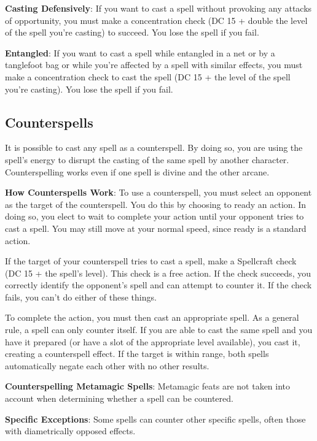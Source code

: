 \textbf{Casting Defensively}: If you want to cast a spell without provoking any attacks of opportunity, you must make a concentration check (DC 15 + double the level of the spell you're casting) to succeed. You lose the spell if you fail.
				
\textbf{Entangled}: If you want to cast a spell while entangled in a net or by a tanglefoot bag or while you're affected by a spell with similar effects, you must make a concentration check to cast the spell (DC 15 + the level of the spell you're casting). You lose the spell if you fail.
				
\subsection{Counterspells}

				
It is possible to cast any spell as a counterspell. By doing so, you are using the spell's energy to disrupt the casting of the same spell by another character. Counterspelling works even if one spell is divine and the other arcane.
				
\textbf{How Counterspells Work}: To use a counterspell, you must select an opponent as the target of the counterspell. You do this by choosing to ready an action. In doing so, you elect to wait to complete your action until your opponent tries to cast a spell. You may still move at your normal speed, since ready is a standard action.
				
If the target of your counterspell tries to cast a spell, make a Spellcraft check (DC 15 + the spell's level). This check is a free action. If the check succeeds, you correctly identify the opponent's spell and can attempt to counter it. If the check fails, you can't do either of these things.
				
To complete the action, you must then cast an appropriate spell. As a general rule, a spell can only counter itself. If you are able to cast the same spell and you have it prepared (or have a slot of the appropriate level available), you cast it, creating a counterspell effect. If the target is within range, both spells automatically negate each other with no other results.
				
\textbf{Counterspelling Metamagic Spells}: Metamagic feats are not taken into account when determining whether a spell can be countered.
				
\textbf{Specific Exceptions}: Some spells can counter other specific spells, often those with diametrically opposed effects.
				
